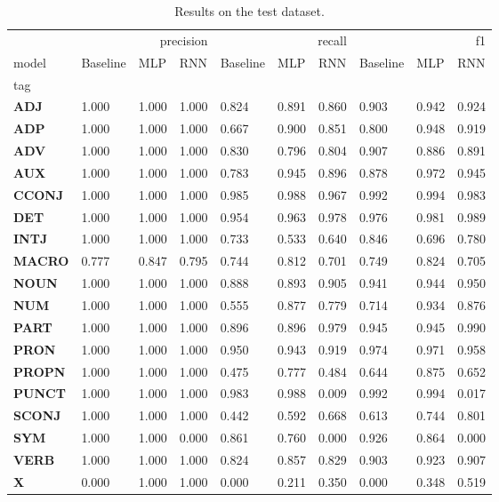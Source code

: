 \begin{table}
\caption{Results on the test dataset.}
\label{tab::ex_2_test}
\begin{tabular}{|l||l||l||l||l||l||l||l||l||l|}
\toprule
 & \multicolumn{3}{r}{precision} & \multicolumn{3}{r}{recall} & \multicolumn{3}{r}{f1} \\
model & Baseline & MLP & RNN & Baseline & MLP & RNN & Baseline & MLP & RNN \\
tag &  &  &  &  &  &  &  &  &  \\
\midrule
\textbf{ADJ} & 1.000 & 1.000 & 1.000 & 0.824 & 0.891 & 0.860 & 0.903 & 0.942 & 0.924 \\
\textbf{ADP} & 1.000 & 1.000 & 1.000 & 0.667 & 0.900 & 0.851 & 0.800 & 0.948 & 0.919 \\
\textbf{ADV} & 1.000 & 1.000 & 1.000 & 0.830 & 0.796 & 0.804 & 0.907 & 0.886 & 0.891 \\
\textbf{AUX} & 1.000 & 1.000 & 1.000 & 0.783 & 0.945 & 0.896 & 0.878 & 0.972 & 0.945 \\
\textbf{CCONJ} & 1.000 & 1.000 & 1.000 & 0.985 & 0.988 & 0.967 & 0.992 & 0.994 & 0.983 \\
\textbf{DET} & 1.000 & 1.000 & 1.000 & 0.954 & 0.963 & 0.978 & 0.976 & 0.981 & 0.989 \\
\textbf{INTJ} & 1.000 & 1.000 & 1.000 & 0.733 & 0.533 & 0.640 & 0.846 & 0.696 & 0.780 \\
\textbf{MACRO} & 0.777 & 0.847 & 0.795 & 0.744 & 0.812 & 0.701 & 0.749 & 0.824 & 0.705 \\
\textbf{NOUN} & 1.000 & 1.000 & 1.000 & 0.888 & 0.893 & 0.905 & 0.941 & 0.944 & 0.950 \\
\textbf{NUM} & 1.000 & 1.000 & 1.000 & 0.555 & 0.877 & 0.779 & 0.714 & 0.934 & 0.876 \\
\textbf{PART} & 1.000 & 1.000 & 1.000 & 0.896 & 0.896 & 0.979 & 0.945 & 0.945 & 0.990 \\
\textbf{PRON} & 1.000 & 1.000 & 1.000 & 0.950 & 0.943 & 0.919 & 0.974 & 0.971 & 0.958 \\
\textbf{PROPN} & 1.000 & 1.000 & 1.000 & 0.475 & 0.777 & 0.484 & 0.644 & 0.875 & 0.652 \\
\textbf{PUNCT} & 1.000 & 1.000 & 1.000 & 0.983 & 0.988 & 0.009 & 0.992 & 0.994 & 0.017 \\
\textbf{SCONJ} & 1.000 & 1.000 & 1.000 & 0.442 & 0.592 & 0.668 & 0.613 & 0.744 & 0.801 \\
\textbf{SYM} & 1.000 & 1.000 & 0.000 & 0.861 & 0.760 & 0.000 & 0.926 & 0.864 & 0.000 \\
\textbf{VERB} & 1.000 & 1.000 & 1.000 & 0.824 & 0.857 & 0.829 & 0.903 & 0.923 & 0.907 \\
\textbf{X} & 0.000 & 1.000 & 1.000 & 0.000 & 0.211 & 0.350 & 0.000 & 0.348 & 0.519 \\
\bottomrule
\end{tabular}
\end{table}
